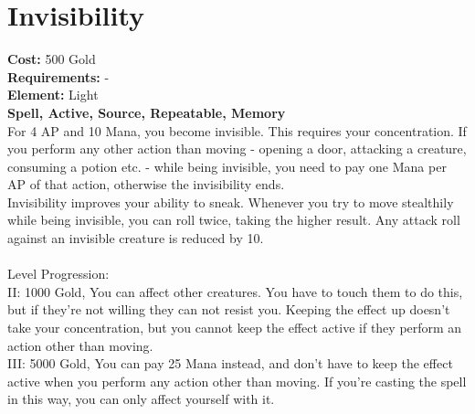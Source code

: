 \section{Invisibility}
\textbf{Cost:} 500 Gold\\
\textbf{Requirements:} -\\
\textbf{Element:} Light\\
\textbf{Spell, Active, Source, Repeatable, Memory}\\
For 4 AP and 10 Mana, you become invisible. This requires your concentration. If you perform any other action than moving - opening a door, attacking a creature, consuming a potion etc. - while being invisible, you need to pay one Mana per AP of that action, otherwise the invisibility ends.\\
Invisibility improves your ability to sneak. Whenever you try to move stealthily while being invisible, you can roll twice, taking the higher result. Any attack roll against an invisible creature is reduced by 10.\\
\\
Level Progression:\\
II: 1000 Gold, You can affect other creatures. You have to touch them to do this, but if they're not willing they can not resist you. Keeping the effect up doesn't take your concentration, but you cannot keep the effect active if they perform an action other than moving.\\
III: 5000 Gold, You can pay 25 Mana instead, and don't have to keep the effect active when you perform any action other than moving. If you're casting the spell in this way, you can only affect yourself with it.\\